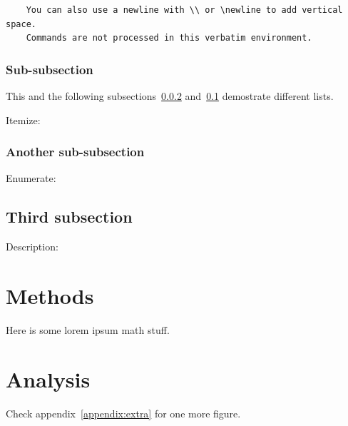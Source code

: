 \documentclass[12pt, a4paper, oneside]{article}
\begin{document}
\begin{verbatim}
    You can also use a newline with \\ or \newline to add vertical space.
    Commands are not processed in this verbatim environment.
\end{verbatim}

\subsubsection{Sub-subsection}

This and the following subsections~\ref{subsubsec:another} and~\ref{subsec:third-subsection} demostrate different lists.

Itemize:
\blinditemize

\subsubsection{Another sub-subsection} \label{subsubsec:another}

Enumerate:
\blindenumerate

\subsection{Third subsection} \label{subsec:third-subsection}

Description:
\blinddescription

\clearpage


\section{Methods} \label{sec:methods}

Here is some lorem ipsum math stuff.

\blindmathpaper

\clearpage


\section{Analysis} \label{sec:analysis}

Check appendix~\ref{appendix:extra} for one more figure.
\end{document}
